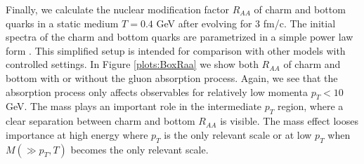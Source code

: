 \documentclass[aps, prc, reprint, amsmath, groupedaddress, nofootinbib]{revtex4-1}
\begin{document}
Finally, we calculate the nuclear modification factor $R_{AA}$ of charm and bottom quarks in a static medium $T=0.4$ GeV after evolving for $3$ fm/c.
The initial spectra of the charm and bottom quarks are parametrized in a simple power law form \cite{Cao:2012jt}.
This simplified setup is intended for comparison with other models with controlled settings.
In Figure \ref{plots:BoxRaa} we show both $R_{AA}$ of charm and bottom with or without the gluon absorption process. 
Again, we see that the absorption process only affects observables for relatively low momenta $p_T < 10$ GeV.
The mass plays an important role in the intermediate $p_T$ region, where a clear separation between charm and bottom $R_{AA}$ is visible.
The mass effect looses importance at high energy where $p_T$ is the only relevant scale or at low $p_T$ when $M (\gg p_T, T)$ becomes the only relevant scale. 
\end{document}
